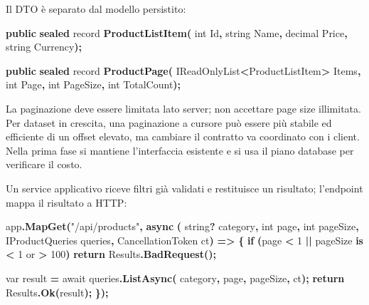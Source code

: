 \documentclass[
  italian,
  10pt,
]{book}
\newenvironment{Shaded}{\begin{snugshade}}{\end{snugshade}}
\newcommand{\DataTypeTok}[1]{\textcolor[rgb]{0.13,0.29,0.53}{#1}}
\newcommand{\DecValTok}[1]{\textcolor[rgb]{0.00,0.00,0.81}{#1}}
\newcommand{\FunctionTok}[1]{\textcolor[rgb]{0.13,0.29,0.53}{\textbf{#1}}}
\newcommand{\KeywordTok}[1]{\textcolor[rgb]{0.13,0.29,0.53}{\textbf{#1}}}
\newcommand{\NormalTok}[1]{#1}
\newcommand{\OperatorTok}[1]{\textcolor[rgb]{0.81,0.36,0.00}{\textbf{#1}}}
\newcommand{\StringTok}[1]{\textcolor[rgb]{0.31,0.60,0.02}{#1}}
\begin{document}
Il DTO è separato dal modello persistito:

\begin{Shaded}
\begin{Highlighting}[]
\KeywordTok{public} \KeywordTok{sealed}\NormalTok{ record }\FunctionTok{ProductListItem}\OperatorTok{(}
    \DataTypeTok{int}\NormalTok{ Id}\OperatorTok{,}
    \DataTypeTok{string}\NormalTok{ Name}\OperatorTok{,}
    \DataTypeTok{decimal}\NormalTok{ Price}\OperatorTok{,}
    \DataTypeTok{string}\NormalTok{ Currency}\OperatorTok{);}

\KeywordTok{public} \KeywordTok{sealed}\NormalTok{ record }\FunctionTok{ProductPage}\OperatorTok{(}
\NormalTok{    IReadOnlyList}\OperatorTok{\textless{}}\NormalTok{ProductListItem}\OperatorTok{\textgreater{}}\NormalTok{ Items}\OperatorTok{,}
    \DataTypeTok{int}\NormalTok{ Page}\OperatorTok{,}
    \DataTypeTok{int}\NormalTok{ PageSize}\OperatorTok{,}
    \DataTypeTok{int}\NormalTok{ TotalCount}\OperatorTok{);}
\end{Highlighting}
\end{Shaded}

La paginazione deve essere limitata lato server; non accettare page size
illimitata. Per dataset in crescita, una paginazione a cursore può
essere più stabile ed efficiente di un offset elevato, ma cambiare il
contratto va coordinato con i client. Nella prima fase si mantiene
l'interfaccia esistente e si usa il piano database per verificare il
costo.

Un service applicativo riceve filtri già validati e restituisce un
risultato; l'endpoint mappa il risultato a HTTP:

\begin{Shaded}
\begin{Highlighting}[]
\NormalTok{app}\OperatorTok{.}\FunctionTok{MapGet}\OperatorTok{(}\StringTok{"/api/products"}\OperatorTok{,} \FunctionTok{async} \OperatorTok{(}
    \DataTypeTok{string}\OperatorTok{?}\NormalTok{ category}\OperatorTok{,}
    \DataTypeTok{int}\NormalTok{ page}\OperatorTok{,}
    \DataTypeTok{int}\NormalTok{ pageSize}\OperatorTok{,}
\NormalTok{    IProductQueries queries}\OperatorTok{,}
\NormalTok{    CancellationToken ct}\OperatorTok{)} \OperatorTok{=\textgreater{}}
\OperatorTok{\{}
    \KeywordTok{if} \OperatorTok{(}\NormalTok{page }\OperatorTok{\textless{}} \DecValTok{1} \OperatorTok{||}\NormalTok{ pageSize }\KeywordTok{is} \OperatorTok{\textless{}} \DecValTok{1}\NormalTok{ or }\OperatorTok{\textgreater{}} \DecValTok{100}\OperatorTok{)}
        \KeywordTok{return}\NormalTok{ Results}\OperatorTok{.}\FunctionTok{BadRequest}\OperatorTok{();}

    \DataTypeTok{var}\NormalTok{ result }\OperatorTok{=}\NormalTok{ await queries}\OperatorTok{.}\FunctionTok{ListAsync}\OperatorTok{(}
\NormalTok{        category}\OperatorTok{,}\NormalTok{ page}\OperatorTok{,}\NormalTok{ pageSize}\OperatorTok{,}\NormalTok{ ct}\OperatorTok{);}
    \KeywordTok{return}\NormalTok{ Results}\OperatorTok{.}\FunctionTok{Ok}\OperatorTok{(}\NormalTok{result}\OperatorTok{);}
\OperatorTok{\});}
\end{Highlighting}
\end{Shaded}
\end{document}
